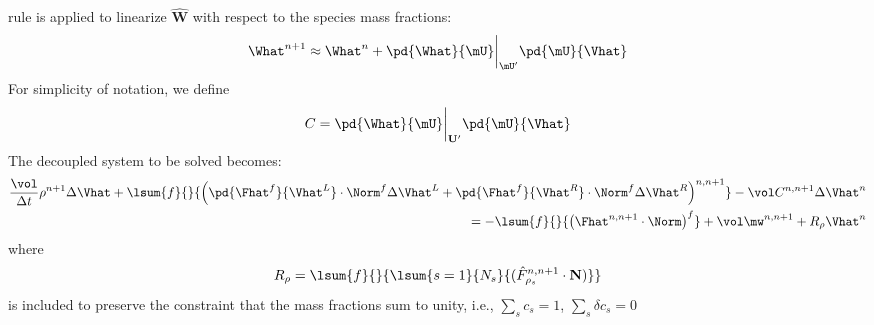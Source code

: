 rule is applied to linearize $\mathbf{\hat{W}}$ with respect to the species mass
fractions:
\begin{equation} 
  \What^{n+1} \approx \What^n + 
  \pd{\What}{\mU} \bigg|_{\mU '} 
  \pd{\mU}{\Vhat}
  \label{source-term-linearization}
\end{equation}
For simplicity of notation, we define
\begin{equation} 
  C = \pd{\What}{\mU} \bigg|_{\mathbf{U}'} \pd{\mU}{\Vhat}
  \label{c-source-term}
\end{equation}
The decoupled system to be solved becomes:
\begin{equation} 
  \begin{split}
    \frac{\vol}{\Delta t} \rho^{n+1} \Delta\Vhat + 
    \lsum{f}{}{ \left( 
      \pd{\Fhat^f}{\Vhat^L} \cdot \Norm^f \Delta \Vhat^L 
    + \pd{\Fhat^f}{\Vhat^R} \cdot \Norm^f \Delta \Vhat^R 
    \right)^{n,n+1}} 
    - \vol C^{n,n+1} \Delta \Vhat^n \\ 
    = -\lsum{f}{}{
      \left( \Fhat^{n,n+1} \cdot \Norm \right)^f 
    } 
    + \vol \mw^{n, n+1} + R_\rho \Vhat^n
  \end{split}
  \label{decoupled-no-scaling}
\end{equation}
where
\begin{equation}
  R_\rho =
  \lsum{f}{}{\lsum{s=1}{N_s}{(\hat{F}_{\rho_s}^{n,n+1}\cdot\mathbf{N})}} 
  \label{dc-constraint}
\end{equation}
is included to preserve the constraint that the mass fractions
sum to unity, i.e., $\sum\limits_{s}{c_s}=1$, $\sum\limits_{s}{\delta c_s}=0$

